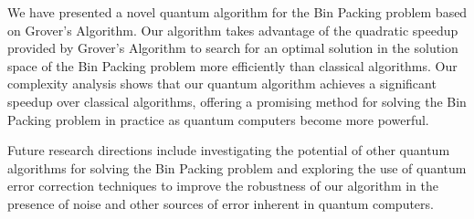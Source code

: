 We have presented a novel quantum algorithm for the Bin Packing problem based on Grover's Algorithm. Our algorithm takes advantage of the quadratic speedup provided by Grover's Algorithm to search for an optimal solution in the solution space of the Bin Packing problem more efficiently than classical algorithms. Our complexity analysis shows that our quantum algorithm achieves a significant speedup over classical algorithms, offering a promising method for solving the Bin Packing problem in practice as quantum computers become more powerful.

Future research directions include investigating the potential of other quantum algorithms for solving the Bin Packing problem and exploring the use of quantum error correction techniques to improve the robustness of our algorithm in the presence of noise and other sources of error inherent in quantum computers.

